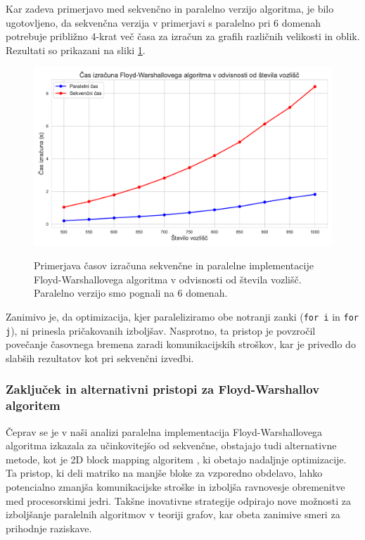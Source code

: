 \documentclass[fin1, tisk]{fmfdelo}
\begin{document}
Kar zadeva primerjavo med sekvenčno in paralelno verzijo algoritma, je bilo ugotovljeno, da sekvenčna verzija v primerjavi s paralelno pri 6 domenah
potrebuje približno 4-krat več časa za izračun za grafih različnih velikosti in oblik. Rezultati so prikazani na sliki \ref{fig:floyd_v_odvisnosti_od_velikosti_grafa}.

\begin{figure}[h!]
  \centering
  \caption{Primerjava časov izračuna sekvenčne in paralelne implementacije Floyd-Warshallovega algoritma v odvisnosti od števila vozlišč. Paralelno verzijo smo pognali na 6 domenah.}
  \includegraphics[width=15cm]{slike/floyd_v_odvisnosti_od_velikosti_grafa.pdf}
  \label{fig:floyd_v_odvisnosti_od_velikosti_grafa}
\end{figure}

Zanimivo je, da optimizacija, kjer paraleliziramo obe notranji zanki (\texttt{for i} in \texttt{for j}), ni prinesla pričakovanih izboljšav.
Nasprotno, ta pristop je povzročil povečanje časovnega bremena zaradi komunikacijskih stroškov, kar je privedlo do slabših rezultatov
kot pri sekvenčni izvedbi.

\subsubsection{Zaključek in alternativni pristopi za Floyd-Warshallov algoritem}

Čeprav se je v naši analizi paralelna implementacija Floyd-Warshallovega algoritma izkazala za učinkovitejšo od sekvenčne, obstajajo tudi
alternativne metode, kot je 2D block mapping algoritem \cite{parallel_floyd_warshall}, ki obetajo nadaljnje optimizacije. Ta pristop, ki deli
matriko na manjše bloke za vzporedno obdelavo, lahko potencialno zmanjša komunikacijske stroške in izboljša ravnovesje obremenitve med
procesorskimi jedri. Takšne inovativne strategije odpirajo nove možnosti za izboljšanje paralelnih algoritmov v teoriji grafov,
kar obeta zanimive smeri za prihodnje raziskave.
\end{document}
